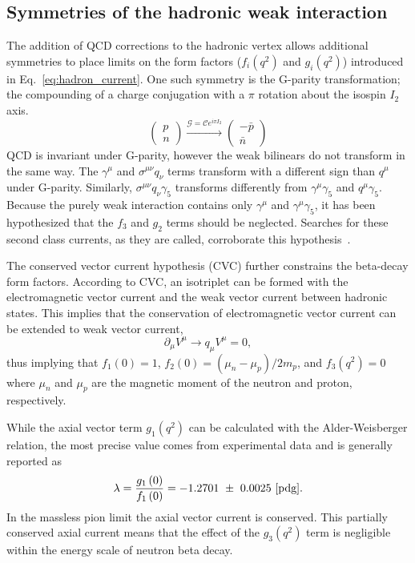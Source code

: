 \documentclass[oneside,12pt]{memoir}
\begin{document}
\subsection{Symmetries of the hadronic weak interaction}
\label{sec:hadron_symmetries}
The addition of QCD corrections to the hadronic vertex allows additional symmetries to place limits on the form factors ($f_i\left(q^2\right)$ and $g_i\left(q^2\right)$) introduced in Eq.~\ref{eq:hadron_current}. One such symmetry is the G-parity transformation; the compounding of a charge conjugation with a $\pi$ rotation about the isospin $I_2$ axis.
\begin{equation}
	\left(\begin{array}{c}p\\n\end{array}\right)
	\xrightarrow{\mathcal{G}=\mathcal{C}e^{i\pi I_2}}
	\left(\begin{array}{c}-\bar{p}\\\bar{n}\end{array}\right)
	\label{eq:gparity}
\end{equation}
QCD is invariant under G-parity, however the weak bilinears do not transform in the same way. The $\gamma^\mu$ and $\sigma^{\mu\nu}q_\nu$ terms transform with a different sign than $q^\mu$ under G-parity. Similarly, $\sigma^{\mu\nu}q_\nu\gamma_5$ transforms differently from $\gamma^\mu\gamma_5$ and $q^\mu\gamma_5$. Because the purely weak interaction contains only $\gamma^\mu$ and $\gamma^\mu\gamma_5$, it has been hypothesized that the $f_3$ and $g_2$ terms should be neglected. Searches for these second class currents, as they are called, corroborate this hypothesis~\cite{langacker76,langacker77}.\par
The conserved vector current hypothesis (CVC) further constrains the beta-decay form factors. According to CVC, an isotriplet can be formed with the electromagnetic vector current and the weak vector current between hadronic states. This implies that the conservation of electromagnetic vector current can be extended to weak vector current,
\begin{equation}
	\partial_\mu V^\mu\longrightarrow q_\mu V^\mu=0,
\end{equation}
thus implying that $f_1\left(0\right)=1$, $f_2\left(0\right)=\left(\mu_n-\mu_p\right)/2m_p$, and $f_3\left(q^2\right)=0$ where $\mu_n$ and $\mu_p$ are the magnetic moment of the neutron and proton, respectively.\par
While the axial vector term $g_1\left(q^2\right)$ can be calculated with the Alder-\-Weis\-berger relation, the most precise value comes from experimental data and is generally reported as
\begin{equation}
	\lambda=\frac{g_1\left(0\right)}{f_1\left(0\right)}
	=-1.2701~\pm~0.0025~\cite{pdg}.
\end{equation}
In the massless pion limit the axial vector current is conserved. This partially conserved axial current means that the effect of the $g_3\left(q^2\right)$ term is negligible within the energy scale of neutron beta decay.
\end{document}
